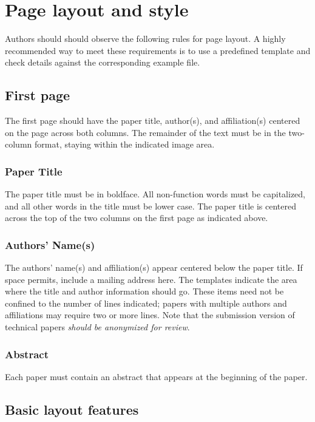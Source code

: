 \section{Page layout and style}

Authors should should observe the following rules for page
layout. A highly  recommended way to meet these requirements
is to use a predefined template and check
details against the corresponding example file.

\subsection{First page}

The first page should have the paper title, author(s), and affiliation(s)
centered on the page across both columns. The remainder of the text 
must be in the two-column format, staying within the indicated image 
area. 

\subsubsection{Paper Title}
The paper title must be in boldface. All non-function words must be capitalized,
and all other words in the title must be lower case. The paper title is centered
across the top of the two columns on the first page as indicated above.

\subsubsection{Authors' Name(s)}
The authors' name(s) and affiliation(s) appear centered below the paper
title. If space permits, include a mailing address here. The templates indicate
the area where the title and author information should go. These items need not
be confined to the number of lines indicated; papers with multiple
authors and affiliations may require two or more lines. 
Note that the submission version of technical papers \emph{should be 
anonymized for review}. 

\subsubsection{Abstract}
Each paper must contain an abstract that appears at the beginning of the paper.

\subsection{Basic layout features}


